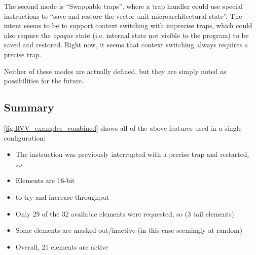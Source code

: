 The second mode is \enquote{Swappable traps}, where a trap handler could use special instructions to \enquote{save and restore the vector unit microarchitectural state}.
The intent seems to be to support context switching with imprecise traps, which could also require the \emph{opaque} state (i.e. internal state not visible to the program) to be saved and restored.
Right now, it seems that context switching always requires a precise trap.

Neither of these modes are actually defined, but they are simply noted as possibilities for the future.

\subsection{Summary}\label{chap:bg:subsec:rvvsummary}
\cref{fig:RVV_examples_combined} shows all of the above features used in a single configuration:
\begin{itemize}
    \item The instruction was previously interrupted with a precise trap and restarted, so 
    \item Elements are 16-bit
    \item {} to try and increase throughput
    \item Only 29 of the 32 available elements were requested, so  (3 tail elements)
    \item Some elements are masked out/inactive (in this case seemingly at random)
    \item Overall, 21 elements are active
\end{itemize}
